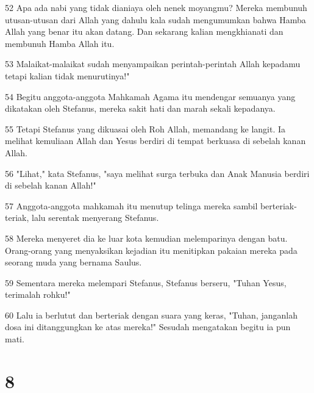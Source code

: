 \par 52 Apa ada nabi yang tidak dianiaya oleh nenek moyangmu? Mereka membunuh utusan-utusan dari Allah yang dahulu kala sudah mengumumkan bahwa Hamba Allah yang benar itu akan datang. Dan sekarang kalian mengkhianati dan membunuh Hamba Allah itu.
\par 53 Malaikat-malaikat sudah menyampaikan perintah-perintah Allah kepadamu tetapi kalian tidak menurutinya!"
\par 54 Begitu anggota-anggota Mahkamah Agama itu mendengar semuanya yang dikatakan oleh Stefanus, mereka sakit hati dan marah sekali kepadanya.
\par 55 Tetapi Stefanus yang dikuasai oleh Roh Allah, memandang ke langit. Ia melihat kemuliaan Allah dan Yesus berdiri di tempat berkuasa di sebelah kanan Allah.
\par 56 "Lihat," kata Stefanus, "saya melihat surga terbuka dan Anak Manusia berdiri di sebelah kanan Allah!"
\par 57 Anggota-anggota mahkamah itu menutup telinga mereka sambil berteriak-teriak, lalu serentak menyerang Stefanus.
\par 58 Mereka menyeret dia ke luar kota kemudian melemparinya dengan batu. Orang-orang yang menyaksikan kejadian itu menitipkan pakaian mereka pada seorang muda yang bernama Saulus.
\par 59 Sementara mereka melempari Stefanus, Stefanus berseru, "Tuhan Yesus, terimalah rohku!"
\par 60 Lalu ia berlutut dan berteriak dengan suara yang keras, "Tuhan, janganlah dosa ini ditanggungkan ke atas mereka!" Sesudah mengatakan begitu ia pun mati.

\chapter{8}

